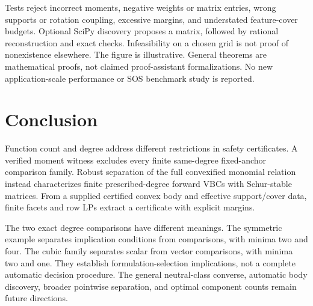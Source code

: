 \documentclass[journal,10pt]{IEEEtran}
\theoremstyle{definition}\newtheorem{definition}{Definition}
\theoremstyle{remark}
\begin{document}
Tests reject incorrect moments, negative weights or matrix entries, wrong supports or rotation coupling, excessive margins, and understated feature-cover budgets. Optional SciPy discovery proposes a matrix, followed by rational reconstruction and exact checks. Infeasibility on a chosen grid is not proof of nonexistence elsewhere. The figure is illustrative. General theorems are mathematical proofs, not claimed proof-assistant formalizations. No new application-scale performance or SOS benchmark study is reported.

\section{Conclusion}
Function count and degree address different restrictions in safety certificates. A verified moment witness excludes every finite same-degree fixed-anchor comparison family. Robust separation of the full convexified monomial relation instead characterizes finite prescribed-degree forward VBCs with Schur-stable matrices. From a supplied certified convex body and effective support/cover data, finite facets and row LPs extract a certificate with explicit margins.

The two exact degree comparisons have different meanings. The symmetric example separates implication conditions from comparisons, with minima two and four. The cubic family separates scalar from vector comparisons, with minima two and one. They establish formulation-selection implications, not a complete automatic decision procedure. The general neutral-class converse, automatic body discovery, broader pointwise separation, and optimal component counts remain future directions.
\end{document}
